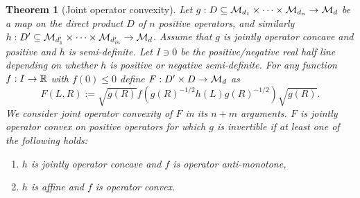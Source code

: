 \documentclass[11pt,a4paper]{article}
\theoremstyle{plain}
\newtheorem{theorem}{Theorem}[section]
\theoremstyle{definition}
\theoremstyle{remark}
\numberwithin{equation}{section}
\begin{document}
\begin{theorem}[Joint operator convexity]
    Let $g:D\subseteq \mathcal{M}_{d_1}\times \cdots \times \mathcal{M}_{d_n}\to \mathcal{M}_d$ be a map on the
    direct product $D$ of $n$ positive operators, and similarly
    $h:D'\subseteq \mathcal{M}_{d'_1}\times \cdots \times \mathcal{M}_{d'_m}\to \mathcal{M}_d$.
    Assume that $g$ is jointly operator concave and positive and $h$ is semi-definite.
    Let $I\ni 0$ be the positive/negative real half line depending on whether $h$ is
    positive or negative semi-definite. For any function $f:I\to \mathbb{R}$ with $f(0)\le 0$
    define $F:D'\times D \to \mathcal{M}_d$ as
    \begin{equation}\label{eq:5.41}
        F(L,R) := \sqrt{g(R)}
        f\!\left(g(R)^{-1/2} h(L) g(R)^{-1/2}\right)
        \sqrt{g(R)}.
    \end{equation}
    We consider joint operator convexity of $F$ in its $n+m$ arguments. $F$ is jointly
    operator convex on positive operators for which $g$ is invertible if at least one of
    the following holds:
    \begin{enumerate}
        \item $h$ is jointly operator concave and $f$ is operator anti-monotone,
        \item $h$ is affine and $f$ is operator convex.
    \end{enumerate}
\end{theorem}
\end{document}
